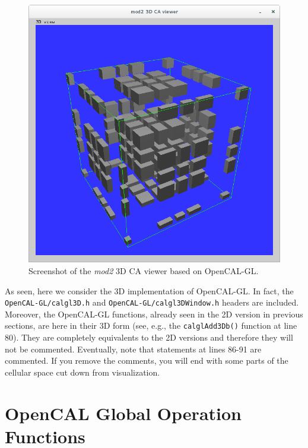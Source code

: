 

\begin{figure}
  \begin{center}
    \includegraphics[width=12cm]{./images/OpenCAL/calgl_mod2}
    \caption{Screenshot of the \emph{mod2} 3D CA viewer based on
      OpenCAL-GL.}
    \label{fig:calgl_mod2}
  \end{center}
\end{figure}

As seen, here we consider the 3D implementation of
OpenCAL-GL. In fact, the \verb'OpenCAL-GL/calgl3D.h' and
\verb'OpenCAL-GL/calgl3DWindow.h' headers are included. Moreover, the
OpenCAL-GL functions, already seen in the 2D version in previous
sections, are here in their 3D form (see, e.g., the
\verb'calglAdd3Db()' function at line 80). They are
completely equivalents to the 2D versions and therefore they will not
be commented. Eventually, note that statements at lines 86-91 are
commented. If you remove the comments, you will end with some parts of
the cellular space cut down from visualization.


\section{OpenCAL Global Operation Functions}\label{sec:redution}

